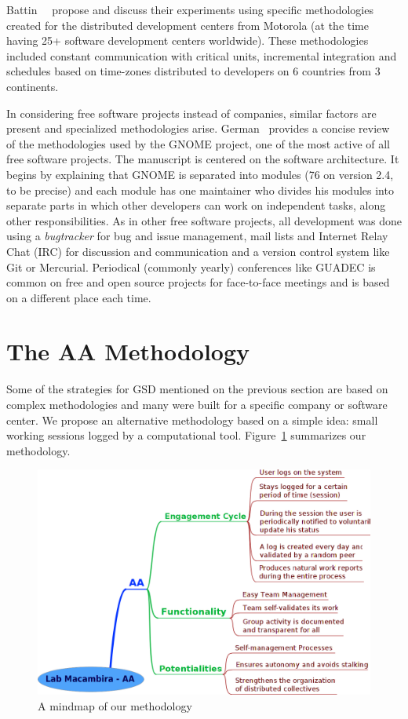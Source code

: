 \documentclass[letterpaper]{article}
\begin{document}
Battin~\etal~\cite{battin2001} propose and discuss their
experiments using specific methodologies created for the distributed
development centers from Motorola (at the time having 25+
software development centers worldwide). These methodologies included
constant communication with critical units, incremental integration
and schedules based on time-zones distributed to developers on 6
countries from 3 continents.

In considering free software projects instead of companies,
similar factors are present and specialized methodologies
arise. German~\cite{german2003} provides a concise review of
the methodologies used by the GNOME project, one of the most active of all free
software projects. The manuscript is centered on the software architecture. It
begins by explaining that GNOME is separated into modules (76 on version 2.4, to be
precise) and each module has one maintainer who divides his modules into
separate parts in which other developers can work on independent tasks, along
other responsibilities. As in other free software projects, all 
development was done using a \emph{bugtracker} for bug and issue management,
mail lists and Internet Relay Chat (IRC) for discussion and communication and a
version control system like Git or Mercurial. Periodical (commonly yearly)
conferences like GUADEC is common on free and open source projects for
face-to-face meetings and is based on a different place each time.


\section{The AA Methodology}
\label{aa-methodology}

Some of the strategies for GSD mentioned on the previous section are based on complex methodologies
and many were built for a specific company or software
center. We propose an alternative methodology based on a simple
idea: small working sessions logged by a computational
tool. Figure~\ref{fig:mm} summarizes our methodology.

\begin{figure}
\begin{center}
   \includegraphics[width=0.8\linewidth,keepaspectratio=true]{figs/aa-mm.png}
\end{center}
   \caption{
   A mindmap of our methodology
   }
\label{fig:mm}
\end{figure}
\end{document}
